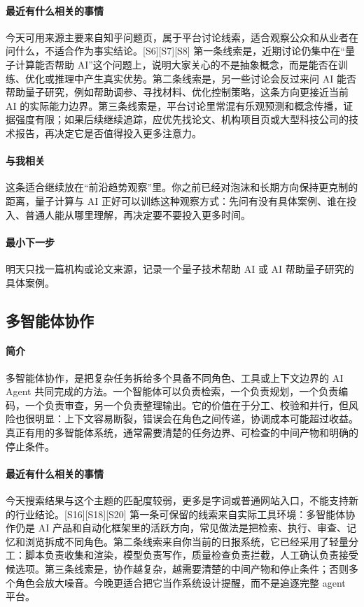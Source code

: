 \documentclass[UTF8,zihao=-4]{ctexart}
\begin{document}
\paragraph{最近有什么相关的事情} 今天可用来源主要来自知乎问题页，属于平台讨论线索，适合观察公众和从业者在问什么，不适合作为事实结论。[S6][S7][S8] 第一条线索是，近期讨论仍集中在“量子计算能否帮助 AI”这个问题上，说明大家关心的不是抽象概念，而是能否在训练、优化或推理中产生真实优势。第二条线索是，另一些讨论会反过来问 AI 能否帮助量子研究，例如帮助调参、寻找材料、优化控制策略，这条方向更接近当前 AI 的实际能力边界。第三条线索是，平台讨论里常混有乐观预测和概念传播，证据强度有限；如果后续继续追踪，应优先找论文、机构项目页或大型科技公司的技术报告，再决定它是否值得投入更多注意力。
\paragraph{与我相关} 这条适合继续放在“前沿趋势观察”里。你之前已经对泡沫和长期方向保持更克制的距离，量子计算与 AI 正好可以训练这种观察方式：先问有没有具体案例、谁在投入、普通人能从哪里理解，再决定要不要投入更多时间。
\paragraph{最小下一步} 明天只找一篇机构或论文来源，记录一个量子技术帮助 AI 或 AI 帮助量子研究的具体案例。
\subsection*{多智能体协作}
\paragraph{简介} 多智能体协作，是把复杂任务拆给多个具备不同角色、工具或上下文边界的 AI Agent 共同完成的方法。一个智能体可以负责检索，一个负责规划，一个负责编码，一个负责审查，另一个负责整理输出。它的价值在于分工、校验和并行，但风险也很明显：上下文容易断裂，错误会在角色之间传递，协调成本可能超过收益。真正有用的多智能体系统，通常需要清楚的任务边界、可检查的中间产物和明确的停止条件。
\paragraph{最近有什么相关的事情} 今天搜索结果与这个主题的匹配度较弱，更多是字词或普通网站入口，不能支持新的行业结论。[S16][S18][S20] 第一条可保留的线索来自实际工具环境：多智能体协作仍是 AI 产品和自动化框架里的活跃方向，常见做法是把检索、执行、审查、记忆和浏览拆成不同角色。第二条线索来自你当前的日报系统，它已经采用了轻量分工：脚本负责收集和渲染，模型负责写作，质量检查负责拦截，人工确认负责接受候选项。第三条线索是，协作越复杂，越需要清楚的中间产物和停止条件；否则多个角色会放大噪音。今晚更适合把它当作系统设计提醒，而不是追逐完整 agent 平台。
\end{document}
